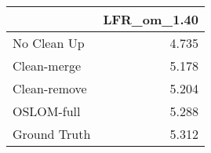 \begin{tabular}{lr}
\toprule
{} & LFR_om_1.40 \\
\midrule
No Clean Up  &       4.735 \\
Clean-merge  &       5.178 \\
Clean-remove &       5.204 \\
OSLOM-full   &       5.288 \\
Ground Truth &       5.312 \\
\bottomrule
\end{tabular}
